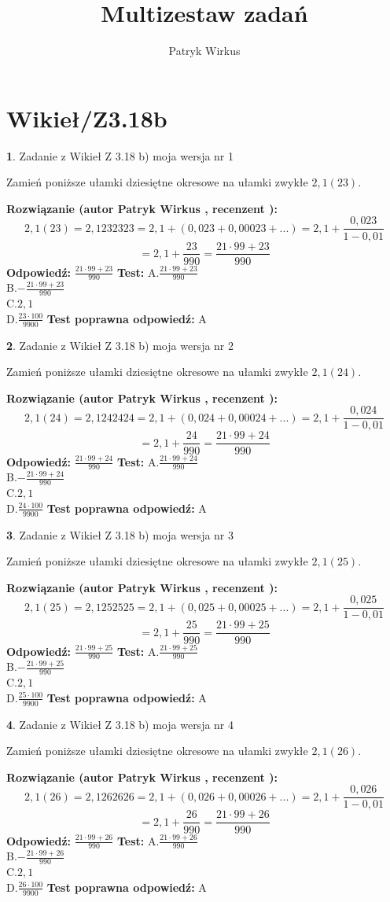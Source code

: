 \documentclass[12pt, a4paper]{article}
\title{Multizestaw zadań}
\author{Patryk Wirkus}
\date{}
\theoremstyle{definition} %
\newtheorem{zad}{}
\newcommand{\kategoria}[1]{\section{#1}}
\newcommand{\zadStart}[1]{\begin{zad}#1\newline}
\newcommand{\zadStop}{\end{zad}}
\newcommand{\rozwStart}[2]{\noindent \textbf{Rozwiązanie (autor #1 , recenzent #2): }\newline}
\newcommand{\rozwStop}{\newline}
\newcommand{\odpStart}{\noindent \textbf{Odpowiedź:}\newline}
\newcommand{\odpStop}{\newline}
\newcommand{\testStart}{\noindent \textbf{Test:}\newline}
\newcommand{\testStop}{\newline}
\newcommand{\kluczStart}{\noindent \textbf{Test poprawna odpowiedź:}\newline}
\newcommand{\kluczStop}{\newline}
\begin{document}
\maketitle

\kategoria{Wikieł/Z3.18b}


\zadStart{Zadanie z Wikieł Z 3.18 b) moja wersja nr 1}

Zamień poniższe ułamki dziesiętne okresowe na ułamki zwykłe $2,1(23)$.
\zadStop
\rozwStart{Patryk Wirkus}{}
$$2,1(23)=2,1232323=2,1+(0,023+0,00023+...)=2,1+\frac{0,023}{1-0,01}$$
$$=2,1+\frac{23}{990}=\frac{21\cdot99+23}{990}$$
\rozwStop
\odpStart
$\frac{21\cdot99+23}{990}$
\odpStop
\testStart
A.$\frac{21\cdot99+23}{990}$\\ B.$-\frac{21\cdot99+23}{990}$\\ C.$2,1$\\ D.$\frac{23\cdot100}{9900}$
\testStop
\kluczStart
A
\kluczStop



\zadStart{Zadanie z Wikieł Z 3.18 b) moja wersja nr 2}

Zamień poniższe ułamki dziesiętne okresowe na ułamki zwykłe $2,1(24)$.
\zadStop
\rozwStart{Patryk Wirkus}{}
$$2,1(24)=2,1242424=2,1+(0,024+0,00024+...)=2,1+\frac{0,024}{1-0,01}$$
$$=2,1+\frac{24}{990}=\frac{21\cdot99+24}{990}$$
\rozwStop
\odpStart
$\frac{21\cdot99+24}{990}$
\odpStop
\testStart
A.$\frac{21\cdot99+24}{990}$\\ B.$-\frac{21\cdot99+24}{990}$\\ C.$2,1$\\ D.$\frac{24\cdot100}{9900}$
\testStop
\kluczStart
A
\kluczStop



\zadStart{Zadanie z Wikieł Z 3.18 b) moja wersja nr 3}

Zamień poniższe ułamki dziesiętne okresowe na ułamki zwykłe $2,1(25)$.
\zadStop
\rozwStart{Patryk Wirkus}{}
$$2,1(25)=2,1252525=2,1+(0,025+0,00025+...)=2,1+\frac{0,025}{1-0,01}$$
$$=2,1+\frac{25}{990}=\frac{21\cdot99+25}{990}$$
\rozwStop
\odpStart
$\frac{21\cdot99+25}{990}$
\odpStop
\testStart
A.$\frac{21\cdot99+25}{990}$\\ B.$-\frac{21\cdot99+25}{990}$\\ C.$2,1$\\ D.$\frac{25\cdot100}{9900}$
\testStop
\kluczStart
A
\kluczStop



\zadStart{Zadanie z Wikieł Z 3.18 b) moja wersja nr 4}

Zamień poniższe ułamki dziesiętne okresowe na ułamki zwykłe $2,1(26)$.
\zadStop
\rozwStart{Patryk Wirkus}{}
$$2,1(26)=2,1262626=2,1+(0,026+0,00026+...)=2,1+\frac{0,026}{1-0,01}$$
$$=2,1+\frac{26}{990}=\frac{21\cdot99+26}{990}$$
\rozwStop
\odpStart
$\frac{21\cdot99+26}{990}$
\odpStop
\testStart
A.$\frac{21\cdot99+26}{990}$\\ B.$-\frac{21\cdot99+26}{990}$\\ C.$2,1$\\ D.$\frac{26\cdot100}{9900}$
\testStop
\kluczStart
A
\kluczStop
\end{document}
